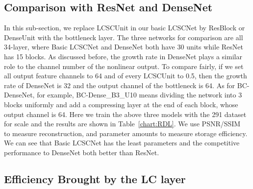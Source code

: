 \documentclass[journal]{IEEEtran}
\begin{document}
\subsection{Comparison with ResNet and DenseNet}\label{s:s_5::A}

In this sub-section, we replace LCSCUnit in our basic LCSCNet by ResBlock or DenseUnit with the bottleneck layer. The three networks for comparison are all 34-layer, where Basic LCSCNet and DenseNet both have 30 units while ResNet has 15 blocks. As discussed before, the growth rate in DenseNet plays a similar role to the channel number of the nonlinear output. To compare fairly, if we set all output feature channels to 64 and  of every LCSCUnit to 0.5, then the growth rate of DenseNet is 32 and the output channel of the bottleneck is 64. As for BC-DenseNet, for example, BC-Dense\_B3\_U10 means dividing the network into 3 blocks uniformly and add a compressing layer at the end of each block, whose output channel is 64. Here we train the above three models with the 291 dataset for  scale and the results are shown in Table~\ref{chart:RDL}. We use PSNR/SSIM~\cite{wang2004image} to measure reconstruction, and parameter amounts to measure storage efficiency. We can see that Basic LCSCNet has the least parameters and the competitive performance to DenseNet both better than ResNet. 


\subsection{Efficiency Brought by the LC layer} \label{s:s_5::B}

\begin{table}[htbp]
\centering
{}
\end{table}
\end{document}
